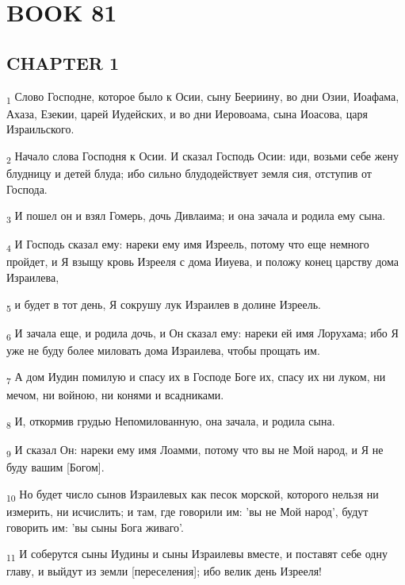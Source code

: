 \section{BOOK 81}
\subsection{CHAPTER 1}
\begin{tcolorbox}
\textsubscript{1} Слово Господне, которое было к Осии, сыну Беериину, во дни Озии, Иоафама, Ахаза, Езекии, царей Иудейских, и во дни Иеровоама, сына Иоасова, царя Израильского.
\end{tcolorbox}
\begin{tcolorbox}
\textsubscript{2} Начало слова Господня к Осии. И сказал Господь Осии: иди, возьми себе жену блудницу и детей блуда; ибо сильно блудодействует земля сия, отступив от Господа.
\end{tcolorbox}
\begin{tcolorbox}
\textsubscript{3} И пошел он и взял Гомерь, дочь Дивлаима; и она зачала и родила ему сына.
\end{tcolorbox}
\begin{tcolorbox}
\textsubscript{4} И Господь сказал ему: нареки ему имя Изреель, потому что еще немного пройдет, и Я взыщу кровь Изрееля с дома Ииуева, и положу конец царству дома Израилева,
\end{tcolorbox}
\begin{tcolorbox}
\textsubscript{5} и будет в тот день, Я сокрушу лук Израилев в долине Изреель.
\end{tcolorbox}
\begin{tcolorbox}
\textsubscript{6} И зачала еще, и родила дочь, и Он сказал ему: нареки ей имя Лорухама; ибо Я уже не буду более миловать дома Израилева, чтобы прощать им.
\end{tcolorbox}
\begin{tcolorbox}
\textsubscript{7} А дом Иудин помилую и спасу их в Господе Боге их, спасу их ни луком, ни мечом, ни войною, ни конями и всадниками.
\end{tcolorbox}
\begin{tcolorbox}
\textsubscript{8} И, откормив грудью Непомилованную, она зачала, и родила сына.
\end{tcolorbox}
\begin{tcolorbox}
\textsubscript{9} И сказал Он: нареки ему имя Лоамми, потому что вы не Мой народ, и Я не буду вашим [Богом].
\end{tcolorbox}
\begin{tcolorbox}
\textsubscript{10} Но будет число сынов Израилевых как песок морской, которого нельзя ни измерить, ни исчислить; и там, где говорили им: 'вы не Мой народ', будут говорить им: 'вы сыны Бога живаго'.
\end{tcolorbox}
\begin{tcolorbox}
\textsubscript{11} И соберутся сыны Иудины и сыны Израилевы вместе, и поставят себе одну главу, и выйдут из земли [переселения]; ибо велик день Изрееля!
\end{tcolorbox}
